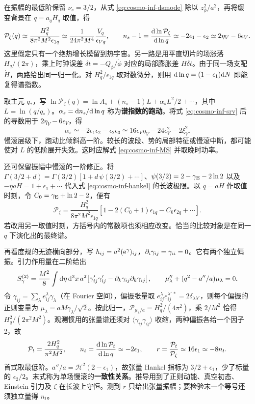 在振幅的最低阶保留 $\nu_s=3/2$，从式 \eqref{eq:cosmo-inf-dsmode} 除以 $z_\phi^2/a^2$，再将缓变背景在 $q=a_qH_q$ 取值，得
\begin{equation}\label{eq:cosmo-inf-As}
 \mathcal P_\zeta(q)\simeq\frac{H_q^2}{8\pi^2M^2\epsilon_{1q}}
 \simeq\frac{1}{24\pi^2M^4}\frac{V_q}{\epsilon_{Vq}},\qquad
 n_s-1=\frac{\dd\ln\mathcal P_\zeta}{\dd\ln q}
 \simeq-2\epsilon_1-\epsilon_2\simeq2\eta_V-6\epsilon_V .
\end{equation}
这里假定只有一个绝热增长模留到热宇宙。另一路是用平直切片的场涨落 $H_q/(2\pi)$，乘上时钟误差 $\delta t=-Q_\phi/\dot\phi$ 对应的局部膨胀差 $H\delta t$。由于同一场支配 $\dot H$，两路给出同一归一化。对 $H_q^2/\epsilon_{1q}$ 取对数微分，则用 $\dd\ln q=(1-\epsilon_1)\dd N$ 即能复得谱指数。

取主元 $q_*$，写 $\ln\mathcal P_\zeta(q)=\ln A_s+(n_s-1)L+\alpha_s L^2/2+\cdots$，其中 $L=\ln(q/q_*)$。$\alpha_s=\dd n_s/\dd\ln q$ 称为\textbf{谱指数的跑动}。将式 \eqref{eq:cosmo-inf-srv} 后的导数用于 $2\eta_V-6\epsilon_V$，得
\[
 \alpha_s\simeq-2\epsilon_1\epsilon_2-\epsilon_2\epsilon_3
 \simeq16\epsilon_V\eta_V-24\epsilon_V^2-2\xi_V^2 .
\]
慢滚层级下，跑动比倾斜高一阶。较长的波段、势的局部特征或慢滚中断，都可能使对 $L$ 的低阶展开失效。这时应解式 \eqref{eq:cosmo-inf-MS} 并取晚时功率。

还可保留振幅中慢滚的一阶修正。将 $\Gamma(3/2+d)=\Gamma(3/2)[1+d\,\psi(3/2)+\cdots]$、$\psi(3/2)=2-\gamma_{\rm E}-2\ln2$ 以及 $-\eta aH=1+\epsilon_1+\cdots$ 代入式 \eqref{eq:cosmo-inf-hankel} 的长波极限。以 $q=aH$ 作取值时刻，令 $C_0=\gamma_{\rm E}+\ln2-2$，便有
\[
 \mathcal P_\zeta=\frac{H_q^2}{8\pi^2M^2\epsilon_{1q}}
 [1-2(C_0+1)\epsilon_{1q}-C_0\epsilon_{2q}+\cdots] .
\]
若改用另一取值时刻，方括号内的常数项也须相应改变。恰当的比较对象是在同一 $q$ 下演化出的最终谱。

再看度规的无迹横向部分，写 $h_{ij}=a^2(\mathrm{e}^\gamma)_{ij}$，$\partial_i\gamma_{ij}=\gamma_{ii}=0$。它有两个独立偏振。引力作用量在二阶给出
\begin{equation}\label{eq:cosmo-inf-tensor}
 S_\gamma^{(2)}=\frac{M^2}{8}\int\dd\eta\,\dd^3x\,a^2
 \big[\gamma_{ij}'\gamma_{ij}'-\partial_k\gamma_{ij}\partial_k\gamma_{ij}\big],
 \qquad \mu_\lambda''+(q^2-a''/a)\mu_\lambda=0 .
\end{equation}
令 $\gamma_{ij}=\sum_{\lambda}e^\lambda_{ij}\gamma_\lambda$（在 Fourier 空间），偏振张量取 $e^\lambda_{ij}e^{\lambda'\,*}_{ij}=2\delta_{\lambda\lambda'}$，则每个偏振的正则变量为 $\mu_\lambda=aM\gamma_\lambda/\sqrt2$。按此归一，$\mathcal P_{\mu_\lambda/a}=H_q^2/(4\pi^2)$，乘 $2/M^2$ 恰得 $H_q^2/(2\pi^2M^2)$。观测惯用的张量谱还须对 $\langle\gamma_{ij}\gamma_{ij}\rangle$ 收缩，两种偏振各给一个因子 2，故
\begin{equation}\label{eq:cosmo-inf-r}
 \mathcal P_t=\frac{2H_q^2}{\pi^2M^2},\qquad
 n_t=\frac{\dd\ln\mathcal P_t}{\dd\ln q}\simeq-2\epsilon_1,\qquad
 r=\frac{\mathcal P_t}{\mathcal P_\zeta}\simeq16\epsilon_1\simeq-8n_t .
\end{equation}
首式取最低阶。$a''/a=\mathcal H^2(2-\epsilon_1)$，故张量 Hankel 指标为 $3/2+\epsilon_1$，少了标量的 $\epsilon_2/2$。末式称为单场慢滚的\textbf{一致性关系}。推导用到了正则动能、真空初态、Einstein 引力及 $\zeta$ 在长波上守恒。测到 $r$ 只给出张量振幅；要检验末一个等号还须独立量得 $n_t$。

